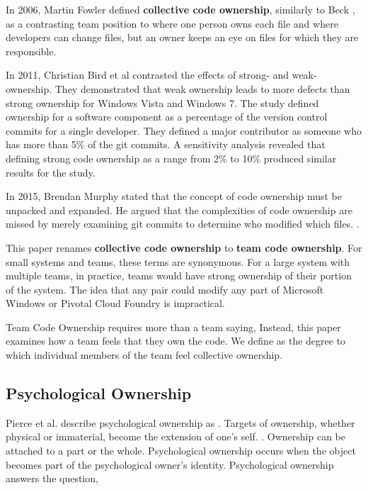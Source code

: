In 2006, Martin Fowler defined \textbf{collective code ownership}, similarly to Beck \cite{FowlerCodeOwnership}, as a contrasting team position to  where one person owns each file and  where developers can change files, but an owner keeps an eye on files for which they are responsible. 

In 2011, Christian Bird et al \cite{BirdDontTouchMyCode} contrasted the effects of strong- and weak-ownership. They demonstrated that weak ownership leads to more defects than strong ownership for Windows Vista and Windows 7. The study defined ownership for a software component as a percentage of the version control commits for a single developer. They defined a major contributor as someone who has more than 5\% of the git commits. A sensitivity analysis revealed that defining strong code ownership as a range from 2\% to 10\% produced similar results for the study.

In 2015, Brendan Murphy stated that the concept of code ownership must be unpacked and expanded. He argued that the complexities of code ownership are missed by merely examining git commits to determine who modified which files. \cite{MurphyIEEESoftware}.

This paper renames \textbf{collective code ownership} to \textbf{team code ownership}. For small systems and teams, these terms are synonymous. For a large system with multiple teams, in practice, teams would have strong ownership of their portion of the system. The idea that any pair could modify any part of Microsoft Windows or Pivotal Cloud Foundry is impractical.

Team Code Ownership requires more than a team saying,  Instead, this paper examines how a team feels that they own the code. We define  as the degree to which individual members of the team feel collective ownership.  

\subsection{Psychological Ownership}
Pierce et al. describe psychological ownership as  \cite{Pierce2001}. Targets of ownership, whether physical or immaterial, become the extension of one's self.  \cite{Isaacs1933}. Ownership can be attached to a part or the whole. Psychological ownership occurs when the object becomes part of the psychological owner's identity. Psychological ownership answers the question, 

